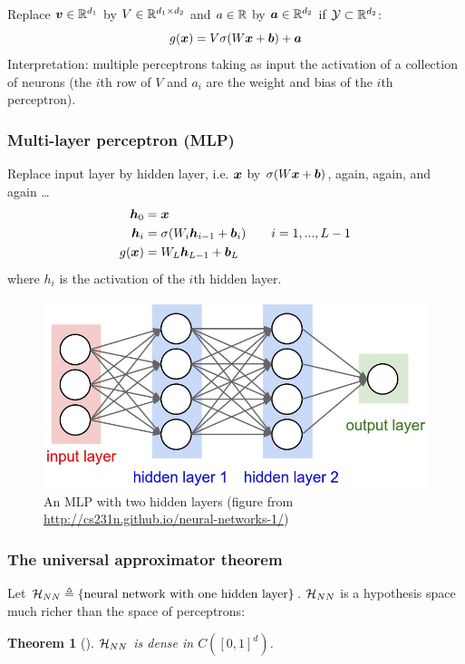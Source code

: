 \documentclass{article}
\newtheorem{theorem}{Theorem}
\begin{document}
Replace ${\bm v} \in {\mathbb R}^{d_1}$ by $V \in {\mathbb R}^{d_1 \times d_2}$ and $a \in {\mathbb R}$ by ${\bm a} \in {\mathbb R}^{d_2}$ if ${\mathcal Y} \subset {\mathbb R}^{d_2}$:
\[
g({\bm x}) = V \sigma (W {\bm x} + {\bm b}) + {\bm a}
\]
Interpretation: multiple perceptrons taking as input the activation of a collection of neurons (the $i$th row of $V$ and $a_i$ are the weight and bias of the $i$th perceptron).

\subsubsection{Multi-layer perceptron (MLP)}

Replace input layer by hidden layer, i.e. ${\bm x}$ by $\sigma (W {\bm x} + {\bm b})$, again, again, and again \ldots
\begin{align*}
{\bm h}_0 & = {\bm x} \\
{\bm h}_i & = \sigma (W_i {\bm h}_{i - 1} + {\bm b}_i) \qquad i = 1, ..., L - 1 \\
g({\bm x}) & = W_L {\bm h}_{L - 1} + {\bm b}_L
\end{align*}
where $h_i$ is the activation of the $i$th hidden layer.

\begin{figure}
\centering
\includegraphics[scale=0.2, valign=t]{neural_net2}
\caption{An MLP with two hidden layers (figure from \url{http://cs231n.github.io/neural-networks-1/})}
\end{figure}

\subsubsection{The universal approximator theorem}

Let ${\mathcal H}_{NN} \triangleq \{\text{neural network with one hidden layer}\}$.
${\mathcal H}_{NN}$ is a hypothesis space much richer than the space of perceptrons:
\begin{theorem}[\cite{cybenko1989approximation}]
${\mathcal H}_{NN}$ is dense in $C ([0, 1]^d)$.
\end{theorem}
\end{document}
